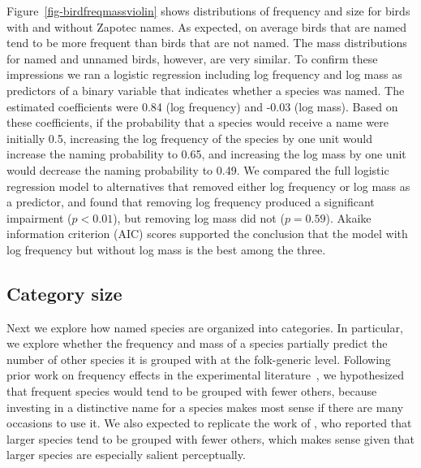 \documentclass[10pt,letterpaper]{article}
\begin{document}
Figure~\ref{fig-birdfreqmassviolin} shows distributions of frequency and size for birds with and without Zapotec names.  As expected, on average birds that are named tend to be more frequent than birds that are not named. The mass distributions for named and unnamed birds, however, are very similar. To confirm these impressions we ran a logistic regression including log frequency and log mass as predictors of a binary variable that indicates whether a species was named. The estimated coefficients were 0.84 (log frequency) and -0.03 (log mass). Based on these coefficients, if the probability that a species would receive a name were initially 0.5, increasing the log frequency of the species by one unit would increase the naming probability to 0.65, and increasing the log mass by one unit would decrease the naming probability to 0.49. We compared the full logistic regression model to alternatives that removed either log frequency or log mass as a predictor, and found that removing log frequency produced a significant impairment ($p < 0.01$), but removing log mass did not ($p = 0.59$).  Akaike information criterion (AIC) scores supported the conclusion that the model with log frequency but without log mass is the best among the three. 





% 
% 
% 
\subsection{Category size}


Next we explore how named species are organized into categories. In particular, we explore whether the frequency and mass of a species partially predict the number of other species it is grouped with at the folk-generic level.  Following prior work on frequency effects in the experimental literature~\cite{parducci83}, we hypothesized that frequent species would tend to be grouped with fewer others, because investing in a distinctive name for a species makes most sense if there are many occasions to use it. We also expected to replicate the work of , who reported that larger species tend to be grouped with fewer others, which makes sense given that larger species are especially salient perceptually. 

\end{document}
